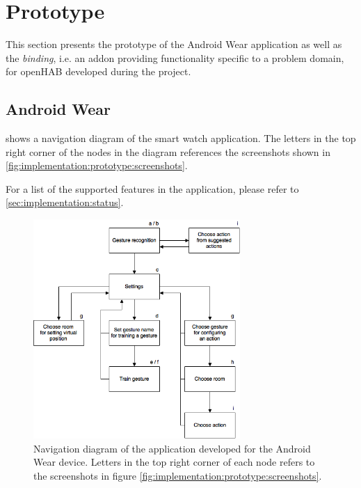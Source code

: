 \section{Prototype}
\label{sec:implementation:prototype}

This section presents the prototype of the Android Wear application as well as the \emph{binding}, i.e. an addon providing functionality specific to a problem domain, for openHAB developed during the project.

\subsection{Android Wear}
\label{sec:implementation:prototype:android-wear}

 shows a navigation diagram of the smart watch application. The letters in the top right corner of the nodes in the diagram references the screenshots shown in \cref{fig:implementation:prototype:screenshots}.

For a list of the supported features in the application, please refer to \cref{sec:implementation:status}.

\begin{figure}[!htb]
    \centering
    \includegraphics[width=0.7\textwidth]{images/wear-navigation-diagram}
    \caption{Navigation diagram of the application developed for the Android Wear device. Letters in the top right corner of each node refers to the screenshots in figure \cref{fig:implementation:prototype:screenshots}.}
    \label{fig:implementation:prototype:navigation-diagram}
\end{figure}

